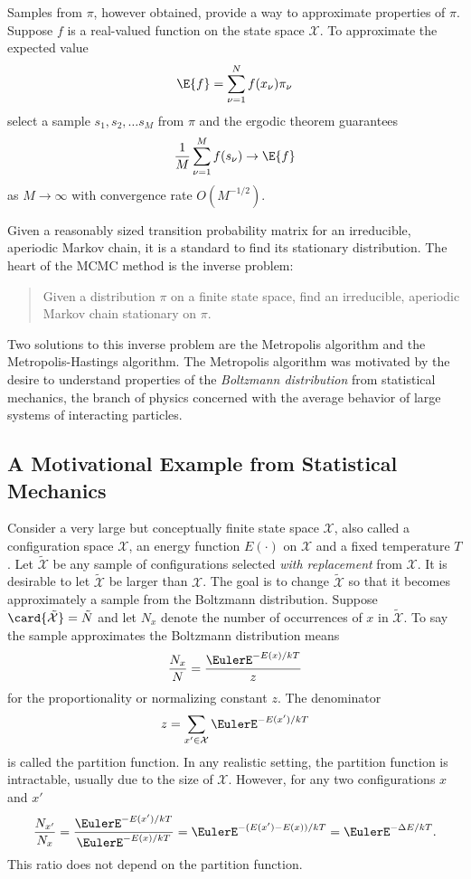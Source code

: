 \documentclass[12pt]{article}
\begin{document}
Samples from \( \pi \), however obtained, provide a way to approximate
properties of \( \pi \).  Suppose \( f \) is a real-valued function on
the state space \( \mathcal{X} \).  To approximate the expected value
\[
    \E{f} = \sum\limits_{\nu=1}^N f(x_\nu) \pi_\nu
\] select a sample \( s_1, s_2, \dots s_M \) from \( \pi \) and the
ergodic theorem guarantees
\[
    \frac{1}{M} \sum\limits_{\nu=1}^M f(s_\nu) \to \E{f}
\] as \( M \to \infty \) with convergence rate \( O(M^{-1/2}) \).

Given a reasonably sized transition probability matrix for an
irreducible, aperiodic Markov chain, it is a standard to find its
stationary distribution.  The heart of the MCMC method is the inverse
problem:
\begin{quotation}
    Given a distribution \( \pi \) on a finite state space, find an
    irreducible, aperiodic Markov chain stationary on \( \pi \).
\end{quotation}
Two solutions to this inverse problem are the Metropolis algorithm and
the Metropolis-Hastings algorithm.%
The Metropolis algorithm was motivated by the desire to understand
properties of the \emph{Boltzmann distribution} from statistical
mechanics, the branch of physics concerned with the average behavior of
large systems of interacting particles.

\subsection*{A Motivational Example from Statistical Mechanics}

Consider a very large but conceptually finite state space \( \mathcal{X}
\), also called a configuration space \( \mathcal{X} \),%
an energy function \( E(\cdot) \) on \( \mathcal{X} \) and a fixed
temperature \( T \).  Let \( \tilde{\mathcal{X}} \) be any sample of
configurations selected \emph{with replacement} from \( \mathcal{X} \).
It is desirable to let \( \tilde{\mathcal {X}} \) be larger than \(
\mathcal{X} \).  The goal is to change \( \tilde{\mathcal{X}} \) so that
it becomes approximately a sample from the Boltzmann distribution.%
Suppose \( \card{\tilde{\mathcal{X}}} = \tilde{N} \) and let \( N_{x} \)
denote the number of occurrences of \( x \) in \( \tilde{\mathcal{X}} \).
To say the sample approximates the Boltzmann distribution means
\[
    \frac{N_{x}}{N} = \frac{\EulerE^{-E(x)/kT}}{z}
\] for the proportionality or normalizing constant \( z \).  The
denominator
\[
    z = \sum\limits_{x' \in \mathcal{X}} \EulerE^{-E(x')/kT}
\] is called the partition function.%
In any realistic setting, the partition function is intractable, usually
due to the size of \( \mathcal{X} \).  However, for any two
configurations \( x \) and \( x' \)
\begin{equation}
    \label{eq:montecarlo:boltzmandiff} \frac{N_{x'}}{N_{x}} = \frac{\EulerE^
    {-E(x')/kT}}{\EulerE^{-E(x)/kT}} = \EulerE^{-(E(x')-E(x))/kT} =
    \EulerE^{-\Delta E/kT}.
\end{equation}
This ratio does not depend on the partition function.
\end{document}
